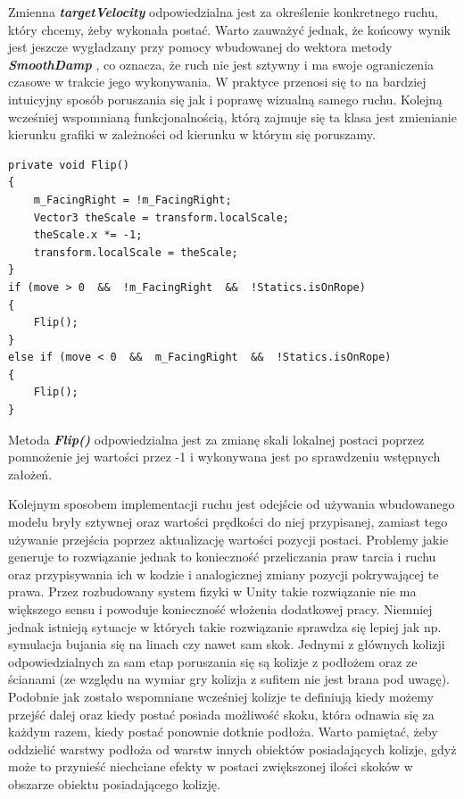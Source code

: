 \documentclass[oneside,polski,logo]{amuthesis}
\begin{document}
Zmienna \textbf{\textit{targetVelocity}} odpowiedzialna jest za określenie konkretnego ruchu, który chcemy, żeby wykonała postać. Warto zauważyć jednak, że końcowy wynik jest jeszcze wygładzany przy pomocy wbudowanej do wektora metody \textbf{\textit{SmoothDamp}} \cite{physics2}, co oznacza, że ruch nie jest sztywny i ma swoje ograniczenia czasowe w trakcie jego wykonywania. W praktyce przenosi się to na bardziej intuicyjny sposób poruszania się jak i poprawę wizualną samego ruchu.
Kolejną wcześniej wspomnianą funkcjonalnością, którą zajmuje się ta klasa jest zmienianie kierunku grafiki w zależności od kierunku w którym się poruszamy.

\begin{lstlisting}[breaklines=true,
language={[Sharp]C},
rulecolor=\color{blue!80!black},
caption={Fragment klasy \texttt{CharacterController.cs}}
]
private void Flip()
{
	m_FacingRight = !m_FacingRight;
	Vector3 theScale = transform.localScale;
	theScale.x *= -1;
	transform.localScale = theScale;
}
if (move > 0  &&  !m_FacingRight  &&  !Statics.isOnRope)
{
	Flip();
}
else if (move < 0  &&  m_FacingRight  &&  !Statics.isOnRope)
{ 
	Flip();
}
\end{lstlisting}

Metoda \textbf{\textit{Flip()}} odpowiedzialna jest za zmianę skali lokalnej postaci poprzez pomnożenie jej wartości przez -1 i wykonywana jest po sprawdzeniu wstępnych założeń.

Kolejnym sposobem implementacji ruchu jest odejście od używania wbudowanego modelu bryły sztywnej oraz wartości prędkości do niej przypisanej, zamiast tego używanie przejścia poprzez aktualizację wartości pozycji postaci. Problemy jakie generuje to rozwiązanie jednak to konieczność przeliczania praw tarcia i ruchu oraz przypisywania ich w kodzie i analogicznej zmiany pozycji pokrywającej te prawa. Przez rozbudowany system fizyki w Unity takie rozwiązanie nie ma większego sensu i powoduje konieczność włożenia dodatkowej pracy. Niemniej jednak istnieją sytuacje w których takie rozwiązanie sprawdza się lepiej jak np. symulacja bujania się na linach czy nawet sam skok.
Jednymi z głównych kolizji odpowiedzialnych za sam etap poruszania się są kolizje z podłożem oraz ze ścianami (ze względu na wymiar gry kolizja z sufitem nie jest brana pod uwagę). Podobnie jak zostało wspomniane wcześniej kolizje te definiują kiedy możemy przejść dalej oraz kiedy postać posiada możliwość skoku, która odnawia się za każdym razem, kiedy postać ponownie dotknie podłoża. Warto pamiętać, żeby oddzielić warstwy podłoża od warstw innych obiektów posiadających kolizje, gdyż może to przynieść niechciane efekty w postaci zwiększonej ilości skoków w obszarze obiektu posiadającego kolizję.
\end{document}
